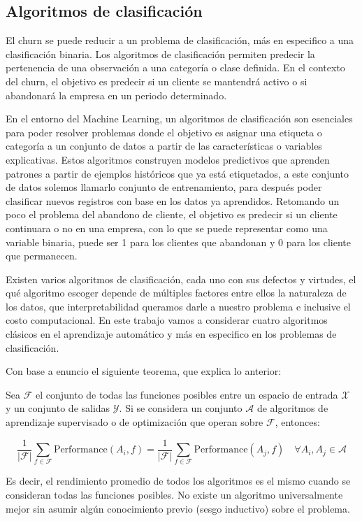\subsection{Algoritmos de clasificación}

El churn se puede reducir a un problema de clasificación, más en especifico a una clasificación binaria. Los algoritmos de clasificación permiten predecir la pertenencia de una observación a una categoría o clase definida. En el contexto del churn, el objetivo es predecir si un cliente se mantendrá activo o si abandonará la empresa en un periodo determinado.

En el entorno del Machine Learning, un algoritmos de clasificación son esenciales para poder resolver problemas donde el objetivo es asignar una etiqueta o categoría a un conjunto de datos a partir de las características o variables explicativas. Estos algoritmos construyen modelos predictivos que aprenden patrones a partir de ejemplos históricos que ya está etiquetados, a este conjunto de datos solemos llamarlo conjunto de entrenamiento, para después poder clasificar nuevos registros con base en los datos ya aprendidos. Retomando un poco el problema del abandono de cliente, el objetivo es predecir si un cliente continuara o no en una empresa, con lo que se puede representar como una variable binaria, puede ser 1 para los clientes que abandonan y 0 para los cliente que permanecen. 

Existen varios algoritmos de clasificación, cada uno con sus defectos y virtudes, el qué algoritmo escoger depende de múltiples factores entre ellos la naturaleza de los datos, que interpretabilidad queramos darle a nuestro problema e inclusive el costo computacional. En este trabajo vamos a considerar cuatro algoritmos clásicos en el aprendizaje automático y más en especifico en los problemas de clasificación.

Con base a \cite{2017Géron} enuncio el siguiente teorema, que explica lo anterior:

\begin{teorema}[colback=gray!10, colframe=black!40!black, title=Teorema No-Free-Lunch]
	
Sea $\mathcal{F}$ el conjunto de todas las funciones posibles entre un espacio de entrada $\mathcal{X}$ y un conjunto de salidas $\mathcal{Y}$. Si se considera un conjunto $\mathcal{A}$ de algoritmos de aprendizaje supervisado o de optimización que operan sobre $\mathcal{F}$, entonces:

\[
\frac{1}{|\mathcal{F}|} \sum_{f \in \mathcal{F}} \text{Performance}(A_i, f) = \frac{1}{|\mathcal{F}|} \sum_{f \in \mathcal{F}} \text{Performance}(A_j, f) \quad \forall A_i, A_j \in \mathcal{A}
\]

Es decir, el rendimiento promedio de todos los algoritmos es el mismo cuando se consideran todas las funciones posibles. No existe un algoritmo universalmente mejor sin asumir algún conocimiento previo (sesgo inductivo) sobre el problema.
	
\end{teorema}

